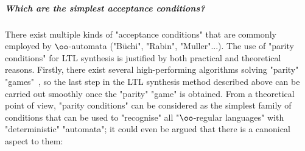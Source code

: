 \documentclass{theoretics}
\begin{document}
\subparagraph{Which are the simplest acceptance conditions?}
There exist multiple kinds of "acceptance conditions" that are commonly employed by $\oo$-automata ("B\"uchi", "Rabin", "Muller"...). The use of "parity conditions" for LTL synthesis is justified by both practical and theoretical reasons. Firstly, there exist several high-performing algorithms solving "parity" "games"~\cite{DiStasio2021ParityGames,FriedmannM09ParityGames,SyntCompReport22,LvD20SymbolicParity,Dijk18Oink}, so the last step in the LTL synthesis method described above can be carried out smoothly once the "parity" "game" is obtained. 
From a theoretical point of view, "parity conditions" can be considered as the simplest family of conditions that can be used to "recognise" all "$\oo$-regular languages" with "deterministic" "automata"; it could even be argued that there is a canonical aspect to them:
\end{document}
